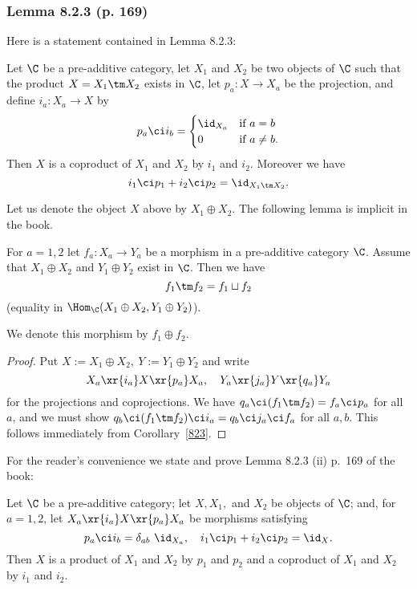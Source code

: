 \documentclass[12pt]{article}
\theoremstyle{remark}
\theoremstyle{definition}
\begin{document}

\subsubsection{Lemma 8.2.3 (p. 169)}

Here is a statement contained in Lemma 8.2.3:

\begin{cor}
Let $\C$ be a pre-additive category, let $X_1$ and $X_2$ be two objects of $\C$ such that the product $X=X_1\tm X_2$ exists in $\C$, let $p_a:X\to X_a$ be the projection, and define $i_a:X_a\to X$ by 
$$
p_a\ci i_b=\begin{cases}\id_{X_a}&\text{if }a=b\\0&\text{if }a\not=b.\end{cases}
$$ 
Then $X$ is a coproduct of $X_1$ and $X_2$ by $i_1$ and $i_2$. Moreover we have 
$$
i_1\ci p_1+i_2\ci p_2=\id_{X_1\tm X_2}.
$$
\end{cor}

Let us denote the object $X$ above by $X_1\oplus X_2$. The following lemma is implicit in the book. 

\begin{lem}
For $a=1,2$ let $f_a:X_a\to Y_a$ be a morphism in a pre-additive category $\C$. Assume that $X_1\oplus X_2$ and $Y_1\oplus Y_2$ exist in $\C$. Then we have 
$$
f_1\tm f_2=f_1\sqcup f_2
$$ 
(equality in $\Hom_\C(X_1\oplus X_2,Y_1\oplus Y_2)$). 
\end{lem} 

We denote this morphism by $f_1\oplus f_2$.\medskip 

\begin{proof}
Put $X:=X_1\oplus X_2,\ Y:=Y_1\oplus Y_2$ and write 
$$
X_a\xr{i_a}X\xr{p_a}X_a,\quad Y_a\xr{j_a}Y\xr{q_a}Y_a
$$ 
for the projections and coprojections. We have $q_a\ci(f_1\tm f_2)=f_a\ci p_a$ for all $a$, and we must show $q_b\ci (f_1\tm f_2)\ci i_a=q_b\ci j_a\ci f_a$ for all $a,b$. This follows immediately from Corollary~\ref{823}.
\end{proof}

For the reader's convenience we state and prove Lemma 8.2.3 (ii) p.~169 of the book:

\begin{lem}[Lemma 8.2.3 (ii) p. 169]
Let $\C$ be a pre-additive category; let $X,X_1,$ and $X_2$ be objects of $\C$; and, for $a=1,2$, let $X_a\xr{i_a}X\xr{p_a}X_a$ be morphisms satisfying 
$$
p_a\ci i_b=\delta_{ab}\ \id_{X_a},\quad i_1\ci p_1+i_2\ci p_2=\id_X.
$$
Then $X$ is a product of $X_1$ and $X_2$ by $p_1$ and $p_2$ and a coproduct of $X_1$ and $X_2$ by $i_1$ and $i_2$. 
\end{lem}
\end{document}
